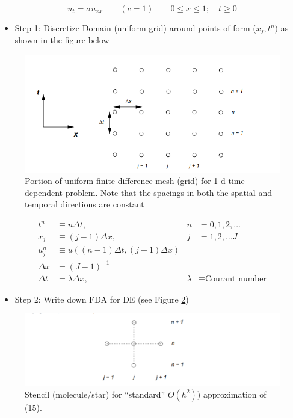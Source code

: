 \begin{equation}
     u_{t} = \sigma u_{xx} \qquad (c=1) \qquad 0 \le x \le 1 ; \quad t\ge0
\end{equation}

\begin{itemize}
    \item Step 1: Discretize Domain (uniform grid) around points of form ($x_j, t^n)$ as shown in the figure below
\end{itemize}

\begin{figure}
    \centering
    \includegraphics[width = 0.8 \linewidth]{Images/1dPDEwaveFDA_grid.png}
    \caption{Portion of uniform finite-difference mesh (grid) for 1-d time-dependent problem. Note that the spacings in both the spatial and temporal directions are constant}
    \label{fig:enter-label}
\end{figure}

\begin{align}
t^n &\equiv n \Delta t, & n &= 0, 1, 2, \ldots \\
x_j &\equiv (j-1)\Delta x, & j &= 1, 2, \ldots J \\
u_j^n &\equiv u((n-1)\Delta t, (j-1)\Delta x) \\
\Delta x &= (J-1)^{-1} \\
\Delta t &= \lambda \Delta x, & \lambda &\equiv \text{Courant number}
\end{align}

\begin{itemize}
    \item Step 2: Write down FDA for DE (see Figure \ref{fig:FDA_constr})
\end{itemize}

\begin{figure}
    \centering
    \includegraphics[width = \linewidth]{Images/stencil_PDE_FDA.png}
    \caption{Stencil (molecule/star) for “standard” $O(h^2)$) approximation of (15).}
    \label{fig:FDA_constr}
\end{figure}


